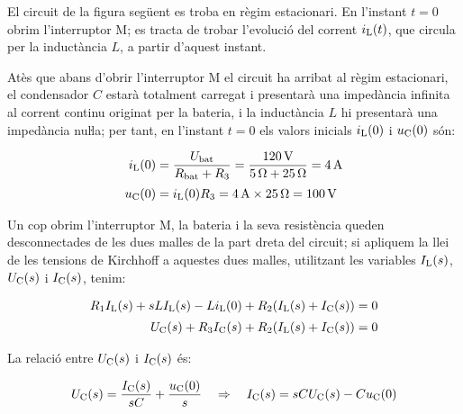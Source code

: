 \begin{exemple}\label{ex:CircuitLaplace}
	\addcontentsxms{\CircuitLaplace}
    El circuit de la figura següent es troba en règim estacionari. En
    l'instant $t=0$ obrim l'interruptor M; es tracta de trobar
    l'evolució del corrent $i_\mathrm{L}(t)$, que circula per la inductància
    $L$, a partir d'aquest instant.

    \begin{center}
        
    \end{center}

     Atès que abans d'obrir l'interruptor M el circuit ha arribat al
     règim estacionari, el condensador $C$ estarà totalment carregat  i
     presentarà una impedància infinita al corrent continu originat per la
     bateria, i la inductància $L$ hi presentarà una impedància nuŀla;
     per tant, en l'instant $t=0$ els valors inicials $i_\mathrm{L}(0)$ i
     $u_\mathrm{C}(0)$ són:

     \begin{align*}
        i_\mathrm{L}(0) &= \frac{U_\mathrm{bat}}{R_\mathrm{bat} + R_3} = \frac{\qty{120}{V}}
        {\qty{5}{\ohm} + \qty{25}{\ohm}} = \qty{4}{A} \\[0.5ex]
        u_\mathrm{C}(0) &= i_\mathrm{L}(0) R_3 = \qty{4}{A}\times \qty{25}{\ohm} = \qty{100}{V}
     \end{align*}

    Un cop obrim l'interruptor M, la bateria i la seva resistència
    queden desconnectades de les dues malles de la part dreta del circuit; si apliquem la llei de les tensions de Kirchhoff  a aquestes
    dues malles, utilitzant les variables $I_\mathrm{L}(s)$, $U_\mathrm{C}(s)$ i
    $I_\mathrm{C}(s)$, tenim:

    \begin{align*}
        R_1 I_\mathrm{L}(s) + s L I_\mathrm{L}(s) - L i_\mathrm{L}(0) + R_2
        (I_\mathrm{L}(s) + I_\mathrm{C}(s)) &=0 \\[0.5ex]
        U_\mathrm{C}(s) + R_3 I_\mathrm{C}(s) + R_2 (I_\mathrm{L}(s) + I_\mathrm{C}(s)) &=0
    \end{align*}

    La relació entre $U_\mathrm{C}(s)$ i $I_\mathrm{C}(s)$ és:

    \begin{equation*}
        U_\mathrm{C}(s) = \frac{I_\mathrm{C}(s)}{s C} + \frac{u_\mathrm{C}(0)}{s}
        \quad\Rightarrow\quad I_\mathrm{C}(s) = s C U_\mathrm{C}(s) - C u_\mathrm{C}(0)
    \end{equation*}


\end{exemple}
